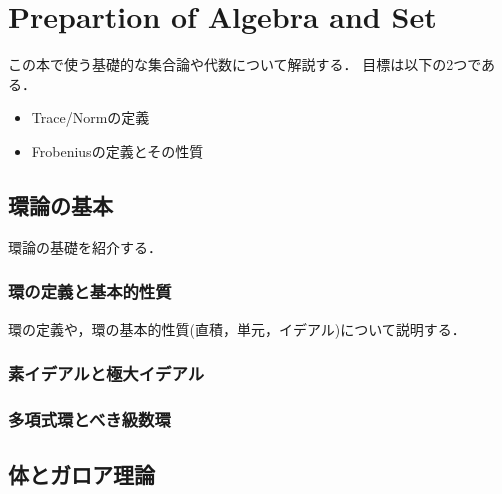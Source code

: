 \documentclass{ujarticle}
\begin{document}
\section{Prepartion of Algebra and Set}
\label{sec:Prepartion of Algebra and Set}
この本で使う基礎的な集合論や代数について解説する．
目標は以下の2つである．
\begin{itemize}
  \item Trace/Normの定義
  \item Frobeniusの定義とその性質
\end{itemize}

\subsection{環論の基本}
\label{sub:環論の基本}
環論の基礎を紹介する．

\subsubsection{環の定義と基本的性質}
\label{sub:環の定義と基本的性質}
環の定義や，環の基本的性質(直積，単元，イデアル)について説明する．

\subsubsection{素イデアルと極大イデアル}
\label{sub:素イデアルと極大イデアル}

\subsubsection{多項式環とべき級数環}
\label{sub:多項式環とべき級数環}

\subsection{体とガロア理論}
\label{sub:体とガロア理論}
\end{document}
